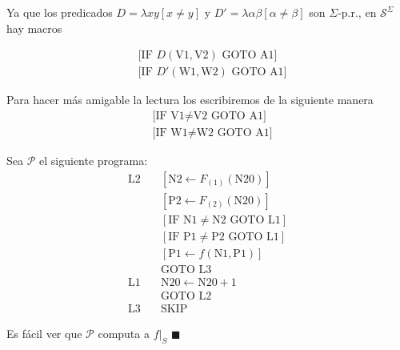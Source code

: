 \documentclass{article}
\begin{document}
Ya que los predicados $D = \lambda xy[x \neq y]$ y $D' = \lambda \alpha \beta[\alpha \neq \beta]$ son $\Sigma$-p.r., en $\mathcal{S}^\Sigma$ hay macros

\[
\begin{aligned}
&\text{[IF } D(\text{V1}, \text{V2}) \text{ GOTO A1]} \\
&\text{[IF } D'(\text{W1}, \text{W2}) \text{ GOTO A1]}
\end{aligned}
\]

Para hacer más amigable la lectura los escribiremos de la siguiente manera
\[
\begin{aligned}
&\text{[IF V1} \neq \text{V2 GOTO A1]} \\
&\text{[IF W1} \neq \text{W2 GOTO A1]}
\end{aligned}
\]

Sea $\mathcal{P}$ el siguiente programa:
\[
\begin{aligned}
\text{L2} &\quad [\text{N2} \leftarrow F_{(1)}(\text{N20})] \\
     &\quad [\text{P2} \leftarrow F_{(2)}(\text{N20})] \\
     &\quad [\text{IF N1} \neq \text{N2 GOTO L1}] \\
     &\quad [\text{IF P1} \neq \text{P2 GOTO L1}] \\
     &\quad [\text{P1} \leftarrow f(\text{N1}, \text{P1})] \\
     &\quad \text{GOTO L3} \\
\text{L1} &\quad \text{N20} \leftarrow \text{N20} + 1 \\
     &\quad \text{GOTO L2} \\
\text{L3} &\quad \text{SKIP}
\end{aligned}
\]

Es fácil ver que $\mathcal{P}$ computa a $f|_S$ \hfill $\blacksquare$
\end{document}
